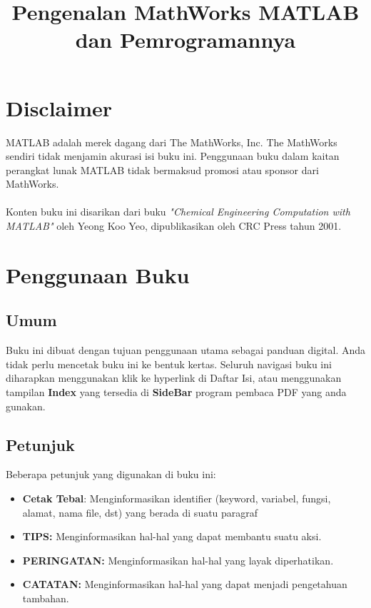 \documentclass[12pt]{book}
\title{\LARGE \bf
	Pengenalan MathWorks MATLAB dan Pemrogramannya\\
}
\author{}
\date{}
\begin{document}
	\frontmatter
	\maketitle
	
	
	\newpage
	\tableofcontents
	
	
	\newpage
	\chapter{Disclaimer}
	
	MATLAB adalah merek dagang dari The MathWorks, Inc.
	The MathWorks sendiri tidak menjamin akurasi isi buku ini.
	Penggunaan buku dalam kaitan perangkat lunak MATLAB tidak bermaksud promosi atau sponsor dari MathWorks.
	\\
	\\
	Konten buku ini disarikan dari buku \textit{"Chemical Engineering Computation with MATLAB"} oleh Yeong Koo Yeo,
	dipublikasikan oleh CRC Press tahun 2001.
	
	
	\newpage
	\chapter{Penggunaan Buku}
	
	\section{Umum}
	Buku ini dibuat dengan tujuan penggunaan utama sebagai panduan digital.
	Anda tidak perlu mencetak buku ini ke bentuk kertas.
	Seluruh navigasi buku ini diharapkan menggunakan klik ke hyperlink di Daftar Isi,
	atau menggunakan tampilan \textbf{Index} yang tersedia di \textbf{SideBar} program pembaca PDF yang anda gunakan.
	
	\section{Petunjuk}
	Beberapa petunjuk yang digunakan di buku ini:
	\begin{itemize}
		\item \textbf{Cetak Tebal}: Menginformasikan identifier (keyword, variabel, fungsi, alamat, nama file, dst) yang berada di suatu paragraf
		\item \textbf{TIPS:} Menginformasikan hal-hal yang dapat membantu suatu aksi.
		\item \textbf{PERINGATAN:} Menginformasikan hal-hal yang layak diperhatikan.
		\item \textbf{CATATAN:} Menginformasikan hal-hal yang dapat menjadi pengetahuan tambahan.
	\end{itemize}
\end{document}
